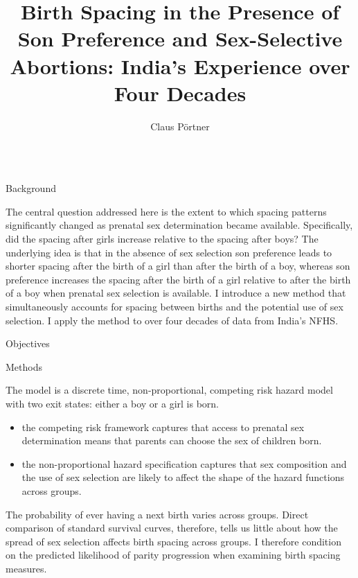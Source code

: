 \documentclass[final]{beamer}
\title{Birth Spacing in the Presence of Son Preference and Sex-Selective \\ Abortions: India's Experience over Four Decades}
\author{Claus P\"ortner}
\institute{Albers School of Business and Economics, Seattle University, \& Center for Studies in Demography and Ecology, University of Washington}
\begin{document}
\begin{frame}{}
\begin{columns}[t]



\begin{column}{.3\linewidth}


\begin{block}{\LARGE Background}

The central question addressed here is the extent to which spacing patterns 
significantly changed as prenatal sex determination became available.
Specifically, did the spacing after girls increase relative to the spacing
after boys?
The underlying idea is that in the absence of sex selection son 
preference leads to shorter spacing after the birth of a girl than after the 
birth of a boy, whereas son preference increases the spacing after the birth 
of a girl relative to after the birth of a boy when prenatal sex selection is 
available.
I introduce a new method that simultaneously accounts for spacing
between births and the potential use of sex selection. 
I apply the method to over four decades of data from India's NFHS.


\end{block}

\begin{block}{Objectives}

\end{block}


\begin{block}{Methods}


The model is a discrete time, non-proportional, competing risk 
hazard model with two exit states: either a boy or a girl is born.
\begin{itemize}
\item the competing risk framework captures that access to prenatal 
sex determination means that parents can choose the sex of children born.
\item the non-proportional hazard specification captures that  
sex composition and the use of sex selection are likely to affect 
the shape of the hazard functions across groups.
\end{itemize}


The probability of ever having a next birth varies across groups.
Direct comparison of standard survival curves, therefore, tells us little 
about how the spread of sex selection affects birth spacing across groups.
I therefore condition on the predicted likelihood of parity 
progression when examining birth spacing measures.


\end{block}
\end{column}
\end{columns}
\end{frame}
\end{document}
